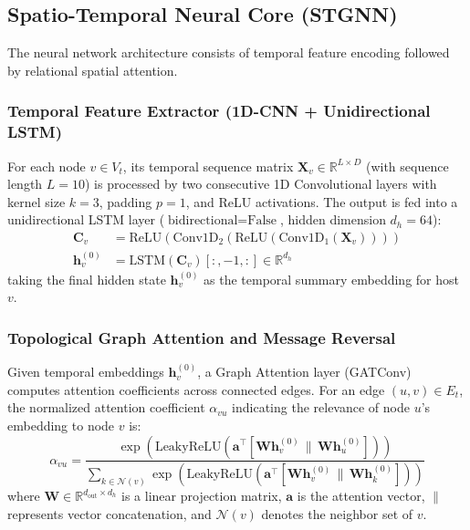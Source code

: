 \documentclass[conference]{IEEEtran}
\begin{document}
\subsection{Spatio-Temporal Neural Core (STGNN)}
The neural network architecture consists of temporal feature encoding followed by relational spatial attention.

\subsubsection{Temporal Feature Extractor (1D-CNN + Unidirectional LSTM)}
For each node $v \in V_t$, its temporal sequence matrix $\mathbf{X}_v \in \mathbb{R}^{L \times D}$ (with sequence length $L=10$) is processed by two consecutive 1D Convolutional layers with kernel size $k=3$, padding $p=1$, and ReLU activations. The output is fed into a unidirectional LSTM layer ($\text{bidirectional} = \text{False}$, hidden dimension $d_h = 64$):
\begin{align}
\mathbf{C}_v &= \text{ReLU}\left( \text{Conv1D}_2\left( \text{ReLU}\left( \text{Conv1D}_1(\mathbf{X}_v) \right) \right) \right) \\
\mathbf{h}_v^{(0)} &= \text{LSTM}(\mathbf{C}_v)[:, -1, :] \in \mathbb{R}^{d_h}
\end{align}
taking the final hidden state $\mathbf{h}_v^{(0)}$ as the temporal summary embedding for host $v$.

\subsubsection{Topological Graph Attention and Message Reversal}
Given temporal embeddings $\mathbf{h}_v^{(0)}$, a Graph Attention layer (GATConv)~\cite{velickovic2018graph} computes attention coefficients across connected edges. For an edge $(u, v) \in E_t$, the normalized attention coefficient $\alpha_{vu}$ indicating the relevance of node $u$'s embedding to node $v$ is:
\begin{equation}
\alpha_{vu} = \frac{\exp\left( \text{LeakyReLU}\left( \mathbf{a}^\top [\mathbf{W}\mathbf{h}_v^{(0)} \,\|\, \mathbf{W}\mathbf{h}_u^{(0)}] \right) \right)}{\sum_{k \in \mathcal{N}(v)} \exp\left( \text{LeakyReLU}\left( \mathbf{a}^\top [\mathbf{W}\mathbf{h}_v^{(0)} \,\|\, \mathbf{W}\mathbf{h}_k^{(0)}] \right) \right)}
\end{equation}
where $\mathbf{W} \in \mathbb{R}^{d_{\text{out}} \times d_h}$ is a linear projection matrix, $\mathbf{a}$ is the attention vector, $\|$ represents vector concatenation, and $\mathcal{N}(v)$ denotes the neighbor set of $v$.
\end{document}
